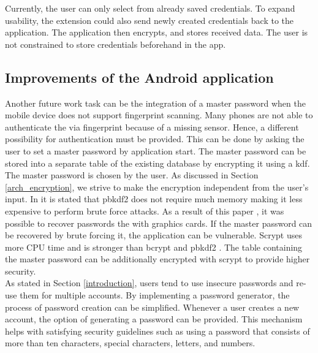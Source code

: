Currently, the user can only select from already saved credentials. To expand usability, the extension could also send newly created credentials back to the application. The application then encrypts, and stores received data. The user is not constrained to store credentials beforehand in the app. 

\subsection{Improvements of the Android application}
Another future work task can be the integration of a master password when the mobile device does not support fingerprint scanning. Many phones are not able to authenticate the via fingerprint because of a missing sensor. Hence, a different possibility for authentication must be provided. This can be done by asking the user to set a master password by application start. The master password can be stored into a separate table of the existing database by encrypting it using a \gls{kdf}. \\
The master password is chosen by the user. As discussed in Section \ref{arch_encryption}, we strive to make the encryption independent from the user's input. In \cite{percival2009stronger} it is stated that \gls{pbkdf2} does not require much memory making it less expensive to perform brute force attacks. As a result of this paper \cite{DurmuthGKPYZ12}, it was possible to recover passwords the with graphics cards. If the master password can be recovered by brute forcing it, the application can be vulnerable. Scrypt uses more CPU time and is stronger than bcrypt and \gls{pbkdf2} \cite{percival2009stronger}. The table containing the master password can be additionally encrypted with scrypt to provide higher security. \\

As stated in Section \ref{introduction}, users tend to use insecure passwords and re-use them for multiple accounts. By implementing a password generator, the process of password creation can be simplified. Whenever a user creates a new account, the option of generating a password can be provided. This mechanism helps with satisfying security guidelines such as using a password that consists of more than ten characters, special characters, letters, and numbers.

